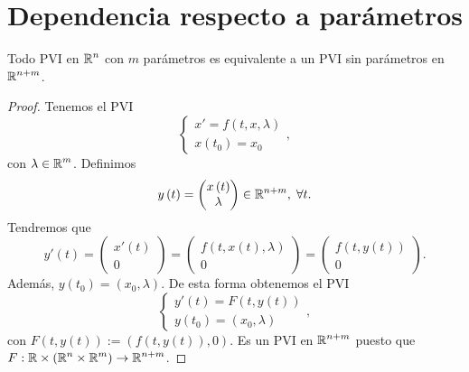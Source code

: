 \section{Dependencia respecto a parámetros}
\begin{prop}
Todo PVI en $\displaystyle \mathbb{R}^{n} $ con $\displaystyle m $ parámetros es equivalente a un PVI sin parámetros en $\displaystyle \mathbb{R}^{n + m} $. 
\end{prop}
\begin{proof}
Tenemos el PVI
\[
\begin{cases}
x' = f\left(t,x,\lambda \right) \\
x\left(t_{0}\right)=x_{0}
\end{cases}
, \]
con $\displaystyle \lambda \in \mathbb{R}^{m} $. Definimos
\[y\left(t\right)=\begin{pmatrix} x\left(t\right)\\ \lambda  \end{pmatrix}\in \mathbb{R}^{n+m}, \; \forall t .\]
Tendremos que 
\[y'\left(t\right)=\begin{pmatrix} x'\left(t\right) \\ 0 \end{pmatrix}=\begin{pmatrix} f\left(t, x\left(t\right), \lambda \right) \\ 0 \end{pmatrix}=\begin{pmatrix} f\left(t, y\left(t\right)\right) \\ 0 \end{pmatrix} .\]
Además, $\displaystyle y\left(t_{0}\right) = \left(x_{0}, \lambda \right) $. De esta forma obtenemos el PVI
\[
\begin{cases}
y'\left(t\right)=F\left(t, y\left(t\right)\right) \\
y\left(t_{0}\right)=\left(x_{0}, \lambda \right)
\end{cases}
,\]
con $\displaystyle F\left(t, y\left(t\right)\right):=\left(f\left(t, y\left(t\right)\right), 0\right) $. Es un PVI en $\displaystyle \mathbb{R}^{n+ m} $ puesto que $\displaystyle F : \mathbb{R} \times \left(\mathbb{R}^{n} \times \mathbb{R}^{m}\right)\to \mathbb{R}^{n+m} $. 
\end{proof}
